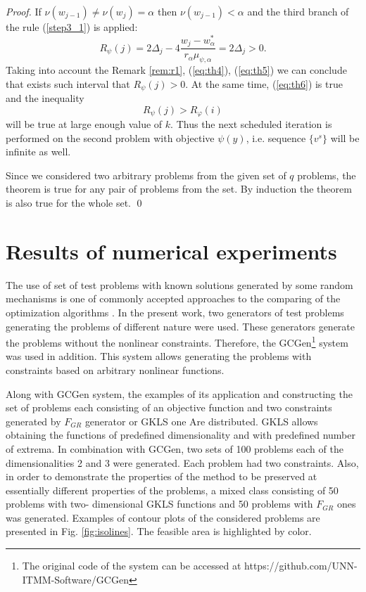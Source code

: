 \documentclass[runningheads]{llncs}
\begin{document}
\begin{proof}
  If \(\nu(w_{j-1})\ne\nu(w_{j})=\alpha\) then \(\nu(w_{j-1})<\alpha\) and the third branch of
  the rule (\ref{step3_1}) is applied:
  \begin{equation}
    R_\psi(j)=2\Delta_j - 4 \frac{w_j-w^*_{\alpha}}{r_\alpha \mu_{\psi,\alpha}}=2\Delta_j > 0.
    \label{eq:th5}
  \end{equation}
  Taking into account the Remark \ref{rem:r1}, (\ref{eq:th4}), (\ref{eq:th5}) we can conclude that
  exists such interval that \(R_\psi(j)>0\). At the same time, (\ref{eq:th6}) is true and
  the inequality
  \begin{displaymath}
    R_\psi(j) > R_\varphi(i)
  \end{displaymath}
  will be true at large enough value of \(k\). Thus the next scheduled iteration is performed on
  the second problem with objective \(\psi(y)\), i.e. sequence \(\{v^s\}\) will be infinite as well.

  Since we considered two arbitrary problems from the given set of \(q\) problems, the theorem is
  true for any pair of problems from the set. By induction the theorem is also true for the whole
  set.
\qed
\end{proof}

\section{Results of numerical experiments}
\label{sec:exps}

The use of set of test problems with known solutions generated by some random mechanisms is
one of commonly accepted approaches to the comparing of the optimization algorithms
\cite{Beiranvand2017}.
In the present work, two generators of test problems generating the problems of different nature
\cite{grishaginClass, Gaviano2003} were used.
These generators generate the problems without the nonlinear constraints. Therefore, the
GCGen\footnote{The original code of the system can be accessed at https://github.com/UNN-
ITMM-Software/GCGen} \cite{GergelBarkalov2019} system was used in addition.
This system allows generating the problems with constraints based on arbitrary nonlinear
functions.

Along with GCGen system, the examples of its application and constructing the set of problems
each consisting of an objective function and two constraints generated by \(F_{GR}\)
\cite{grishaginClass} generator or GKLS \cite{Gaviano2003} one Are distributed.
GKLS \cite{Gaviano2003} allows obtaining the functions of predefined dimensionality and
with predefined number of extrema.
In combination with GCGen, two sets of 100 problems each of the dimensionalities 2 and 3
were generated.
Each problem had two constraints.
Also, in order to demonstrate the properties of the method to be preserved at essentially
different properties of the problems, a mixed class consisting of 50 problems with two-
dimensional GKLS functions and 50 problems with \(F_{GR}\) ones was generated.
Examples of contour plots of the considered problems are presented in Fig. \ref{fig:isolines}.
The feasible area is highlighted by color.
\end{document}
